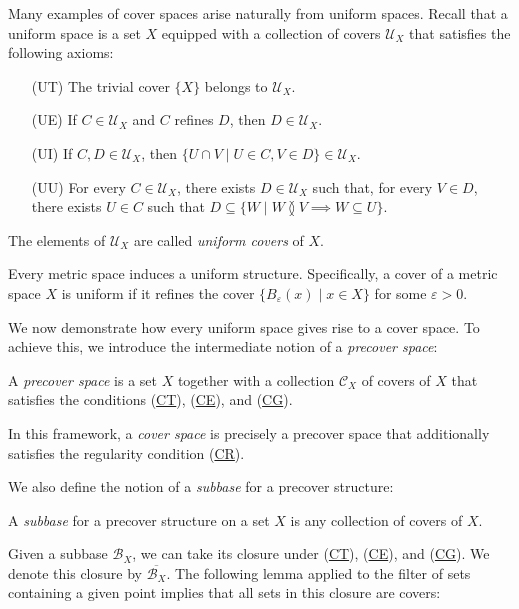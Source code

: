 \documentclass[reqno]{amsart}
\newcommand{\axitem}[1]{\phantomsection \label{ax:#1}}
\newcommand{\axref}[1]{(\hyperref[ax:#1]{#1})}
\theoremstyle{definition}
\theoremstyle{remark}
\numberwithin{figure}{section}
\newcommand{\overlap}[2]{#1 \between #2}
\begin{document}
Many examples of cover spaces arise naturally from uniform spaces.
Recall that a uniform space is a set $X$ equipped with a collection of covers $\mathcal{U}_X$ that satisfies the following axioms:

\begin{itemize}
\item[(UT)] The trivial cover $\{ X \}$ belongs to $\mathcal{U}_X$.
\item[(UE)] \axitem{UE} If $C \in \mathcal{U}_X$ and $C$ refines $D$, then $D \in \mathcal{U}_X$.
\item[(UI)] \axitem{UI} If $C,D \in \mathcal{U}_X$, then $\{ U \cap V \mid U \in C, V \in D \} \in \mathcal{U}_X$.
\item[(UU)] \axitem{UU} For every $C \in \mathcal{U}_X$, there exists $D \in \mathcal{U}_X$ such that, for every $V \in D$,
there exists $U \in C$ such that $D \subseteq \{ W \mid \overlap{W}{V} \implies W \subseteq U \}$.
\end{itemize}
The elements of $\mathcal{U}_X$ are called \emph{uniform covers} of $X$.

\begin{example}
Every metric space induces a uniform structure.
Specifically, a cover of a metric space $X$ is uniform if it refines the cover $\{ B_\varepsilon(x) \mid x \in X \}$ for some $\varepsilon > 0$.
\end{example}

We now demonstrate how every uniform space gives rise to a cover space.
To achieve this, we introduce the intermediate notion of a \emph{precover space}:

\begin{defn}
A \emph{precover space} is a set $X$ together with a collection $\mathcal{C}_X$ of covers of $X$ that satisfies the conditions \axref{CT}, \axref{CE}, and \axref{CG}.
\end{defn}

In this framework, a \emph{cover space} is precisely a precover space that additionally satisfies the regularity condition \axref{CR}.

We also define the notion of a \emph{subbase} for a precover structure:

\begin{defn}
A \emph{subbase} for a precover structure on a set $X$ is any collection of covers of $X$.
\end{defn}

Given a subbase $\mathcal{B}_X$, we can take its closure under \axref{CT}, \axref{CE}, and \axref{CG}.
We denote this closure by $\overline{\mathcal{B}_X}$.
The following lemma applied to the filter of sets containing a given point implies that all sets in this closure are covers:
\end{document}
